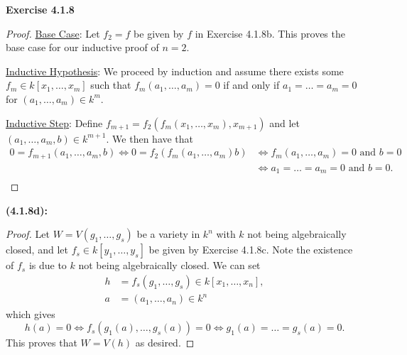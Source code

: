 \documentclass[12pt,oneside]{article}
\newenvironment{exercise}[1]{\vspace{.1in}\noindent\textbf{Exercise #1 \hspace{.05em}}}{}
\begin{document}
\begin{exercise}{4.1.8}
\begin{proof}
        \bigskip
        \underline{Base Case}:
        Let $f_2 = f$ be given by $f$ in Exercise 4.1.8b. This proves the base case for 
        our inductive proof of $n=2$. 
        
        \bigskip
        \underline{Inductive Hypothesis}:
        We proceed by induction and assume there exists some
        $f_m \in k[x_1,\ldots,x_m]$ such that $f_m(a_1,\ldots, a_m) = 0$ if and only if 
        $a_1 = \ldots = a_m = 0$ for $(a_1,\ldots, a_m) \in k^m$. 
        
        \bigskip
        \underline{Inductive Step}:
        Define $f_{m+1} = f_2(f_m(x_1,\ldots,x_m),x_{m+1})$ and let 
        $(a_1,\ldots,a_m,b) \in k^{m+1}$. We then have that 
        \begin{align*}
            0 = f_{m+1}(a_1,\ldots,a_m,b) \Leftrightarrow 0 = f_2(f_m(a_1,\ldots,a_m)b) &\Leftrightarrow f_m(a_1,\ldots,a_m) = 0 \text{ and } b=0\\
            &\Leftrightarrow a_1 = \ldots = a_m = 0 \text{ and } b=0.\\
        \end{align*}
    \end{proof}
    
    \newpage
    \textbf{(4.1.8d):}
    \begin{proof}
        Let $W = V(g_1,\ldots,g_s)$ be a variety in $k^n$ with $k$ not being algebraically 
        closed, and let $f_s \in k[y_1,\ldots,y_s]$ be given by Exercise 4.1.8c. Note 
        the existence of $f_s$ is due to $k$ not being algebraically closed. We can set 
        \begin{align*}
            h&=f_s(g_1,\ldots,g_s) \in k[x_1,\ldots,x_n],\\
            a&=(a_1,\ldots,a_n) \in k^n
        \end{align*}
        which gives 
        \[
            h(a) = 0 \Leftrightarrow f_s(g_1(a),\ldots,g_s(a)) = 0 \Leftrightarrow g_1(a) = \ldots = g_s(a) = 0.
        \]
        This proves that $W = V(h)$ as desired.
    \end{proof}
\end{exercise}


\end{document}

